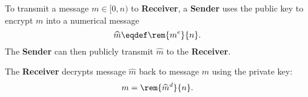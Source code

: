 \documentclass[handout]{mcs}
\begin{document}
{{\begin{description}
\begin{enumerate}
\end{enumerate}

\item[Encoding]

To transmit a message $m \in [0,n)$ to \textbf{Receiver}, a \textbf{Sender} uses the
  public key to encrypt $m$ into a numerical message
\[
\widehat{m} \eqdef \rem{m^e}{n}.
\]
The \textbf{Sender} can then publicly transmit $\widehat{m}$ to the
\textbf{Receiver}.

\item[Decoding] The \textbf{Receiver} decrypts message $\widehat{m}$
  back to message $m$ using the private key:
\[
m = \rem{\widehat{m}^d}{n}.
\]

\end{description}
}}
\end{document}
